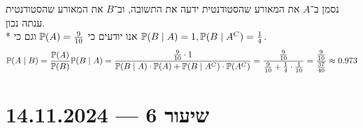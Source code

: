 \begin{solution}
	נסמן ב־$A$ את המאורע שהסטודנטית ידעה את התשובה, וב־$B$ את המאורע שהסטודנטית ענתה נכון. \\*
	אנו יודעים כי $\mathbb{P}(A) = \frac{9}{10}$ וגם כי $\mathbb{P}(B \mid A) = 1, \mathbb{P}(B \mid A^C) = \frac{1}{4}$.
	\[
		\mathbb{P}(A \mid B)
		= \frac{\mathbb{P}(A)}{\mathbb{P}(B)} \mathbb{P}(B \mid A)
		= \frac{\frac{9}{10} \cdot 1}{\mathbb{P}(B \mid A) \cdot \mathbb{P}(A) + \mathbb{P}(B \mid A^C) \cdot \mathbb{P}(A^C)}
		= \frac{\frac{9}{10}}{\frac{9}{10} + \frac{1}{4} \cdot \frac{1}{10}}
		= \frac{\frac{9}{10}}{\frac{37}{40}}
		\approx 0.973
	\]
\end{solution}

\section{שיעור 6 --- 14.11.2024}

